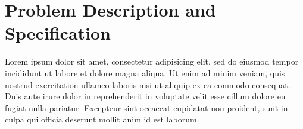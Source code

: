 \documentclass[report.tex]{subfiles}
\begin{document}
\chapter{Problem Description and Specification} %
\label{cha:problem_description_and_specification}
Lorem ipsum dolor sit amet, consectetur adipisicing elit, sed do eiusmod
tempor incididunt ut labore et dolore magna aliqua. Ut enim ad minim veniam,
quis nostrud exercitation ullamco laboris nisi ut aliquip ex ea commodo
consequat. Duis aute irure dolor in reprehenderit in voluptate velit esse
cillum dolore eu fugiat nulla pariatur. Excepteur sint occaecat cupidatat non
proident, sunt in culpa qui officia deserunt mollit anim id est laborum.

\newpage
\end{document}
